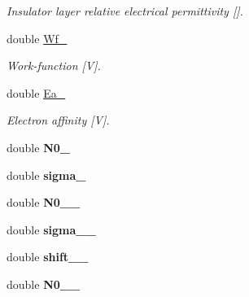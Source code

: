 \begin{DoxyCompactItemize}
\begin{DoxyCompactList}\small\item\em Insulator layer relative electrical permittivity \mbox{[}\mbox{]}. \end{DoxyCompactList}\item 
\hypertarget{classParamsList_abdbc36c238ba50f2a0e2bc72298f5752}{double \hyperlink{classParamsList_abdbc36c238ba50f2a0e2bc72298f5752}{Wf\-\_\-}}\label{classParamsList_abdbc36c238ba50f2a0e2bc72298f5752}

\begin{DoxyCompactList}\small\item\em Work-\/function \mbox{[}V\mbox{]}. \end{DoxyCompactList}\item 
\hypertarget{classParamsList_ad6c06799c99e628d22b697bc5977a598}{double \hyperlink{classParamsList_ad6c06799c99e628d22b697bc5977a598}{Ea\-\_\-}}\label{classParamsList_ad6c06799c99e628d22b697bc5977a598}

\begin{DoxyCompactList}\small\item\em Electron affinity \mbox{[}V\mbox{]}. \end{DoxyCompactList}\item 
\hypertarget{classParamsList_ab02f44dcc57ae9925ef021ac2856ed0b}{double {\bfseries N0\-\_\-}}\label{classParamsList_ab02f44dcc57ae9925ef021ac2856ed0b}

\item 
\hypertarget{classParamsList_a497f69dd5195462ce23e591069b4232f}{double {\bfseries sigma\-\_\-}}\label{classParamsList_a497f69dd5195462ce23e591069b4232f}

\item 
\hypertarget{classParamsList_a6ebf9f469e500f05185919e534c6f6d4}{double {\bfseries N0\-\_\-\_\-}}\label{classParamsList_a6ebf9f469e500f05185919e534c6f6d4}

\item 
\hypertarget{classParamsList_a1743ba1b8d56ae8f3ab9256e6f8b62bd}{double {\bfseries sigma\-\_\-\_\-}}\label{classParamsList_a1743ba1b8d56ae8f3ab9256e6f8b62bd}

\item 
\hypertarget{classParamsList_a9ae72a20f59400fc96f9e33ed21dfb39}{double {\bfseries shift\-\_\-\_\-}}\label{classParamsList_a9ae72a20f59400fc96f9e33ed21dfb39}

\item 
\hypertarget{classParamsList_afa2f537bf13e1e3105ec91f9282c6dc6}{double {\bfseries N0\-\_\-\_\-}}\label{classParamsList_afa2f537bf13e1e3105ec91f9282c6dc6}


\end{DoxyCompactItemize}
